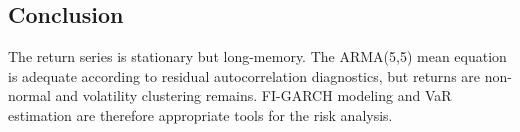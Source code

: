 \documentclass[
  11pt,
]{article}
\begin{document}
\subsection{Conclusion}\label{conclusion}

The return series is stationary but long-memory. The ARMA(5,5) mean
equation is adequate according to residual autocorrelation diagnostics,
but returns are non-normal and volatility clustering remains. FI-GARCH
modeling and VaR estimation are therefore appropriate tools for the risk
analysis.
\end{document}
